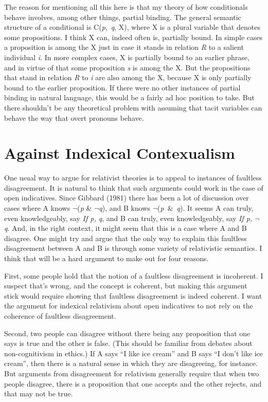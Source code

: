 The reason for mentioning all this here is that my theory of how conditionals behave involves, among other things, partial binding. The general semantic structure of a conditional is C(\textit{p},~\textit{q}, X), where X is a plural variable that denotes some propositions. I think X can, indeed often is, partially bound. In simple cases a proposition is among the X just in case it stands in relation \textit{R} to a salient individual \textit{i}. In more complex cases, X is partially bound to an earlier phrase, and in virtue of that some proposition \textit{s} is among the X. But the propositions that stand in relation \textit{R} to \textit{i} are also among the X, because X is only partially bound to the earlier proposition. If there were no other instances of partial binding in natural language, this would be a fairly ad hoc position to take. But there shouldn't be any theoretical problem with assuming that tacit variables can behave the way that overt pronouns behave.


\section{Against Indexical Contexualism}

One usual way to argue for relativist theories is to appeal to instances of faultless disagreement. It is natural to think that such arguments could work in the case of open indicatives. Since Gibbard (1981) there has been a lot of discussion over cases where A knows \(\neg\){}(\textit{p} \& \(\neg\){}\textit{q}), and B knows \(\neg\){}(\textit{p}~\&~\textit{q}). It seems A can truly, even knowledgeably, say \textit{If p, q}, and B can truly, even knowledgeably, say \textit{If p, }\(\neg\){}\textit{q}. And, in the right context, it might seem that this is a case where A and B disagree. One might try and argue that the only way to explain this faultless disagreement between A and B is through some variety of relativistic semantics. I think that will be a hard argument to make out for four reasons.

First, some people hold that the notion of a faultless disagreement is incoherent. I suspect that's wrong, and the concept is coherent, but making this argument stick would require showing that faultless disagreement is indeed coherent. I want the argument for indexical relativism about open indicatives to not rely on the coherence of faultless disagreement.

Second, two people can disagree without there being any proposition that one says is true and the other is false. (This should be familiar from debates about non-cognitivism in ethics.) If A says ``I like ice cream'' and B says ``I don't like ice cream'', then there is a natural sense in which they are disagreeing, for instance. But arguments from disagreement for relativism generally require that when two people disagree, there is a proposition that one accepts and the other rejects, and that may not be true.

